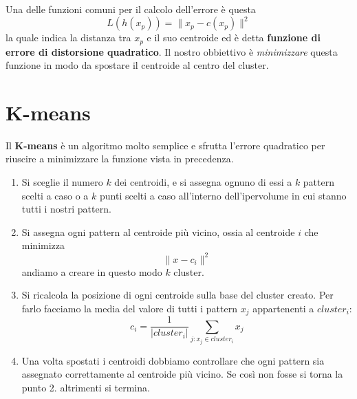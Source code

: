 Una delle funzioni comuni per il calcolo dell'errore \`e questa
\[ L(h(x_p)) = \| x_p - c(x_p) \|^2 \]
la quale indica la distanza tra $x_p$ e il suo centroide ed \`e detta \textbf{funzione di errore di distorsione quadratico}.
Il nostro obbiettivo \`e \emph{minimizzare} questa funzione in modo da spostare il centroide al centro del cluster.

\section{K-means}
Il \textbf{K-means} \`e un algoritmo molto semplice e sfrutta l'errore quadratico per riuscire a minimizzare la funzione
vista in precedenza.
\begin{enumerate}
	\item Si sceglie il numero $k$ dei centroidi, e si assegna ognuno di essi a $k$ pattern scelti a caso o a $k$ punti
	      scelti a caso all'interno dell'ipervolume in cui stanno tutti i nostri pattern.
	\item Si assegna ogni pattern al centroide pi\`u vicino, ossia al centroide $i$ che minimizza
	      \[ \| x - c_i \|^2 \]
	      andiamo a creare in questo modo $k$ cluster.
	\item Si ricalcola la posizione di ogni centroide sulla base del cluster creato. Per farlo facciamo la media del
	      valore di tutti i pattern $x_j$ appartenenti a $cluster_i$:
	      \[ c_i = \frac{1}{|cluster_i|} \sum_{j : x_j \in cluster_i} x_j \]
	\item Una volta spostati i centroidi dobbiamo controllare che ogni pattern sia assegnato correttamente al centroide
	      pi\`u vicino. Se cos\`i non fosse si torna la punto 2. altrimenti si termina.
\end{enumerate}